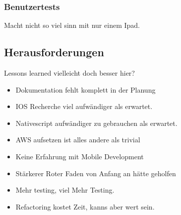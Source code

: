 \subsubsection*{Benutzertests}
Macht nicht so viel sinn mit nur einem Ipad.


\subsection{Herausforderungen}

Lessons learned vielleicht doch besser hier?

\begin{itemize}
    \item Dokumentation fehlt komplett in der Planung
    \item IOS Recherche viel aufwändiger als erwartet.
    \item Nativescript aufwändiger zu gebrauchen als erwartet.
    \item AWS aufsetzen ist alles andere als trivial
    \item Keine Erfahrung mit Mobile Development
    \item Stärkerer Roter Faden von Anfang an hätte geholfen
    \item Mehr testing, viel Mehr Testing.
    \item Refactoring kostet Zeit, kanns aber wert sein.
\end{itemize}







